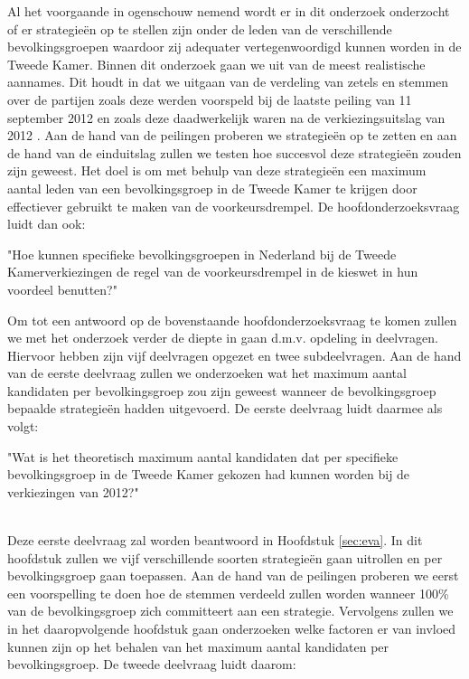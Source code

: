 Al het voorgaande in ogenschouw nemend wordt er in dit onderzoek onderzocht of er strategie\"{e}n op te stellen zijn onder de leden van de verschillende bevolkingsgroepen waardoor zij adequater vertegenwoordigd kunnen worden in de Tweede Kamer. Binnen dit onderzoek gaan we uit van de meest realistische aannames. Dit houdt in dat we uitgaan van de verdeling van zetels en stemmen over de partijen zoals deze werden voorspeld bij de laatste peiling van 11 september 2012 \citep{IPSOS} en zoals deze daadwerkelijk waren na de verkiezingsuitslag van 2012 \citep{Kiesraad_uitslag}. Aan de hand van de peilingen proberen we strategie\"{e}n op te zetten en aan de hand van de einduitslag zullen we testen hoe succesvol deze strategie\"{e}n zouden zijn geweest. Het doel is om met behulp van deze strategie\"{e}n een maximum aantal leden van een bevolkingsgroep in de Tweede Kamer te krijgen door effectiever gebruikt te maken van de voorkeursdrempel. De hoofdonderzoeksvraag luidt dan ook: \\


\begin{HOV}
\large
"Hoe kunnen specifieke bevolkingsgroepen in Nederland bij de Tweede Kamerverkiezingen de regel van de voorkeursdrempel in de kieswet in hun voordeel benutten?"\\
\end{HOV}

\normalsize
Om tot een antwoord op de bovenstaande hoofdonderzoeksvraag te komen zullen we met het onderzoek verder de diepte in gaan d.m.v. opdeling in deelvragen. Hiervoor hebben zijn vijf deelvragen opgezet en twee subdeelvragen. Aan de hand van de eerste deelvraag zullen we onderzoeken wat het maximum aantal kandidaten per bevolkingsgroep zou zijn geweest wanneer de bevolkingsgroep bepaalde strategie\"{e}n hadden uitgevoerd. De eerste deelvraag luidt daarmee als volgt:\\

\begin{DV}
"Wat is het theoretisch maximum aantal kandidaten dat per specifieke bevolkingsgroep in de Tweede Kamer gekozen had kunnen worden bij de verkiezingen van 2012?"\\\
\end{DV}

Deze eerste deelvraag zal worden beantwoord in Hoofdstuk \ref{sec:eva}. In dit hoofdstuk zullen we vijf verschillende soorten strategie\"{e}n gaan uitrollen en per  bevolkingsgroep gaan toepassen. Aan de hand van de peilingen proberen we eerst een voorspelling te doen hoe de stemmen verdeeld zullen worden wanneer 100\% van de bevolkingsgroep zich committeert aan een strategie. Vervolgens zullen we in het daaropvolgende hoofdstuk gaan onderzoeken welke factoren er van invloed kunnen zijn op het behalen van het maximum aantal kandidaten per bevolkingsgroep. De tweede deelvraag luidt daarom: \\


